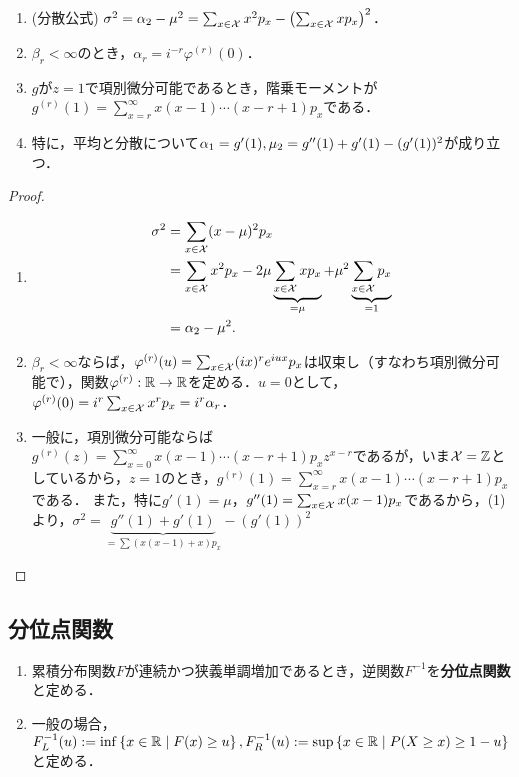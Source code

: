 \documentclass[uplatex,dvipdfmx]{jsreport}
\begin{document}
\begin{lemma}\label{lemma-variance-formula}\mbox{}
    \begin{enumerate}
        \item (分散公式) $\sigma^2=\alpha_2-\mu^2=\sum_{x\in\mathcal{X}}x^2p_x-\left(\sum_{x\in\mathcal{X}}xp_x\right)^2$．
        \item $\beta_r<\infty$のとき，$\alpha_r=i^{-r}\varphi^{(r)}(0)$．
        \item $g$が$z=1$で項別微分可能であるとき，階乗モーメントが$g^{(r)}(1)=\sum^\infty_{x=r}x(x-1)\cdots(x-r+1)p_x$である．
        \item 特に，平均と分散について$\alpha_1=g'(1),\mu_2=g''(1)+g'(1)-(g'(1))^2$が成り立つ．
    \end{enumerate}
\end{lemma}
\begin{proof}\mbox{}
    \begin{enumerate}
        \item \begin{align*}
            \sigma^2&=\sum_{x\in\mathcal{X}}(x-\mu)^2p_x\\
            &=\sum_{x\in\mathcal{X}}x^2p_x-2\mu\underbrace{\sum_{x\in\mathcal{X}}xp_x}_{=\mu}+\mu^2\underbrace{\sum_{x\in\mathcal{X}}p_x}_{=1}\\
            &=\alpha_2-\mu^2.
        \end{align*}
        \item $\beta_r<\infty$ならば，$\varphi^{(r)}(u)=\sum_{x\in\mathcal{X}}(ix)^re^{iux}p_x$は収束し（すなわち項別微分可能で），関数$\varphi^{(r)}:\mathbb{R}\to\mathbb{R}$を定める．$u=0$として，$\varphi^{(r)}(0)=i^r\sum_{x\in\mathcal{X}}x^rp_x=i^r\alpha_r$．
        \item 一般に，項別微分可能ならば$g^{(r)}(z)=\sum^\infty_{x=0}x(x-1)\cdots(x-r+1)p_xz^{x-r}$であるが，いま$\mathcal{X}=\mathbb{Z}$としているから，$z=1$のとき，$g^{(r)}(1)=\sum^\infty_{x=r}x(x-1)\cdots(x-r+1)p_x$である．
        また，特に$g'(1)=\mu$，$g''(1)=\sum_{x\in\mathcal{X}}x(x-1)p_x$であるから，(1)より，$\sigma^2=\underbrace{g''(1)+g'(1)}_{=\sum(x(x-1)+x)p_x}-(g'(1))^2$
    \end{enumerate}
\end{proof}


\subsection{分位点関数}

\begin{definition}\mbox{}
    \begin{enumerate}
        \item 累積分布関数$F$が連続かつ狭義単調増加であるとき，逆関数$F^{-1}$を\textbf{分位点関数}と定める．
        \item 一般の場合，$F_L^{-1}(u):=\inf\left\{x\in\mathbb{R}\mid F(x)\ge u\right\},F_R^{-1}(u):=\sup\left\{x\in\mathbb{R}\mid P(X\ge x)\ge1-u\right\}$と定める．
    \end{enumerate}
\end{definition}
\end{document}
